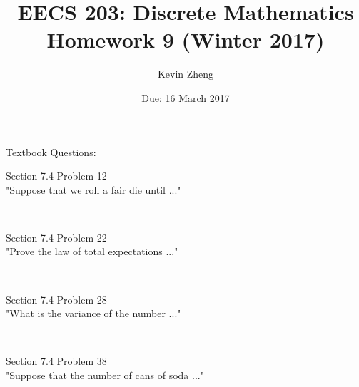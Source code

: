 \documentclass[11pt]{exam}
\begin{document}
\title{ EECS 203: Discrete Mathematics \\
        Homework 9 (Winter 2017)}
\date{Due: 16 March 2017}
\author{Kevin Zheng}

\maketitle

\begin{questions}

{\bf \item[] Textbook Questions:}
\question[4.0] Section 7.4 Problem 12 \\
"Suppose that we roll a fair die until ..."
\begin{solution}\\




\end{solution}
\question[3.0] Section 7.4 Problem 22 \\
"Prove the law of total expectations ..."
\begin{solution}\\




\end{solution}
\question[3.0] Section 7.4 Problem 28 \\
"What is the variance of the number ..."
\begin{solution}\\




\end{solution}
\question[4.0] Section 7.4 Problem 38 \\
"Suppose that the number of cans of soda ..."
\begin{solution}\\





\end{solution}
\end{questions}
\end{document}
